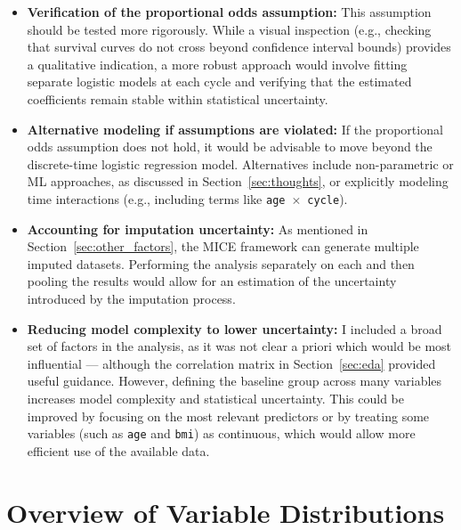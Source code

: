 \documentclass[11pt]{article}
\begin{document}
\begin{itemize}
    \item \textbf{Verification of the proportional odds assumption:} This assumption should be tested more rigorously. While a visual inspection (e.g., checking that survival curves do not cross beyond confidence interval bounds) provides a qualitative indication, a more robust approach would involve fitting separate logistic models at each cycle and verifying that the estimated coefficients remain stable within statistical uncertainty.

    \item \textbf{Alternative modeling if assumptions are violated:} If the proportional odds assumption does not hold, it would be advisable to move beyond the discrete-time logistic regression model. Alternatives include non-parametric or ML approaches, as discussed in Section~\ref{sec:thoughts}, or explicitly modeling time interactions (e.g., including terms like \texttt{age}~$\times$~\texttt{cycle}).

    \item \textbf{Accounting for imputation uncertainty:} As mentioned in Section~\ref{sec:other_factors}, the MICE framework can generate multiple imputed datasets. Performing the analysis separately on each and then pooling the results would allow for an estimation of the uncertainty introduced by the imputation process.

    \item \textbf{Reducing model complexity to lower uncertainty:} I included a broad set of factors in the analysis, as it was not clear a priori which would be most influential — although the correlation matrix in Section~\ref{sec:eda} provided useful guidance. However, defining the baseline group across many variables increases model complexity and statistical uncertainty. This could be improved by focusing on the most relevant predictors or by treating some variables (such as \texttt{age} and \texttt{bmi}) as continuous, which would allow more efficient use of the available data.
    
\end{itemize}




\clearpage

\appendix
\section{Overview of Variable Distributions}
\label{app:variables}
\end{document}
